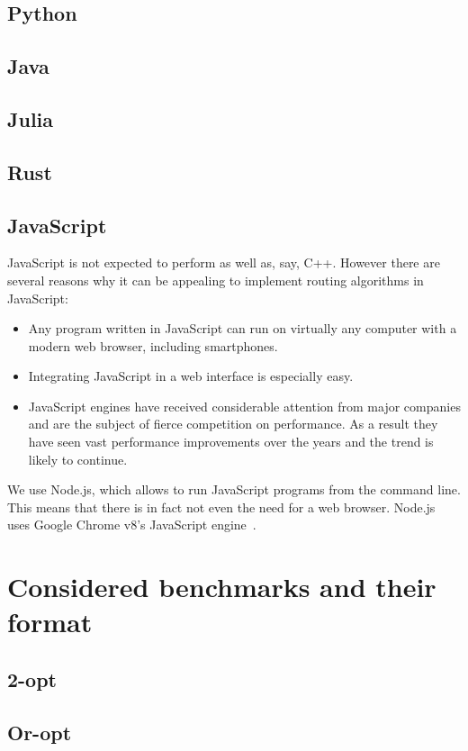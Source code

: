 \documentclass[11pt,a4paper,notitlepage]{article}
\begin{document}
\subsection{Python}
\subsection{Java}
\subsection{Julia}
\subsection{Rust}
\subsection{JavaScript}
JavaScript is not expected to perform as well as, say, C++. However
there are several reasons why it can be appealing to implement routing
algorithms in JavaScript:
\begin{itemize}
\item Any program written in JavaScript can run on virtually any
  computer with a modern web browser, including smartphones.
\item Integrating JavaScript in a web interface is especially easy.
\item JavaScript engines have received considerable attention from
  major companies and are the subject of fierce competition on
  performance. As a result they have seen vast performance
  improvements over the years and the trend is likely to continue.
\end{itemize}

We use Node.js, which allows to run JavaScript programs from the
command line. This means that there is in fact not even the need for a
web browser. Node.js uses Google Chrome v8's JavaScript engine~\cite{nodejs}.

\section{Considered benchmarks and their format}
\subsection{2-opt}
\subsection{Or-opt}
\end{document}
